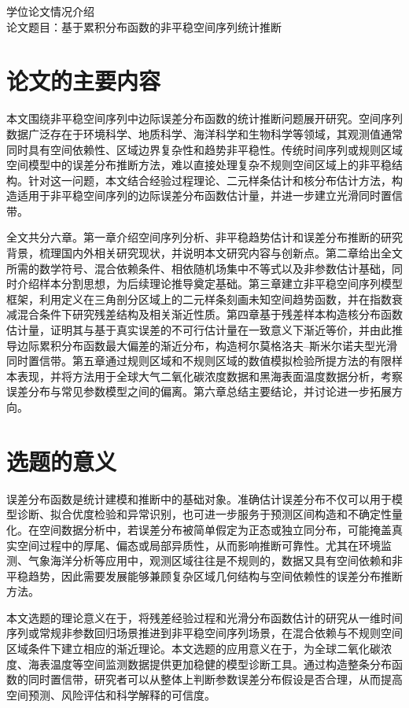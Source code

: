 \documentclass[UTF8,a4paper,11pt]{ctexart}
\begin{document}
\begin{center}
  {\heiti{} 学位论文情况介绍}\\[0.25em]
  { 论文题目：基于累积分布函数的非平稳空间序列统计推断}
\end{center}

\section{论文的主要内容}

本文围绕非平稳空间序列中边际误差分布函数的统计推断问题展开研究。空间序列数据广泛存在于环境科学、地质科学、海洋科学和生物科学等领域，其观测值通常同时具有空间依赖性、区域边界复杂性和趋势非平稳性。传统时间序列或规则区域空间模型中的误差分布推断方法，难以直接处理复杂不规则空间区域上的非平稳结构。针对这一问题，本文结合经验过程理论、二元样条估计和核分布估计方法，构造适用于非平稳空间序列的边际误差分布函数估计量，并进一步建立光滑同时置信带。

全文共分六章。第一章介绍空间序列分析、非平稳趋势估计和误差分布推断的研究背景，梳理国内外相关研究现状，并说明本文研究内容与创新点。第二章给出全文所需的数学符号、混合依赖条件、相依随机场集中不等式以及非参数估计基础，同时介绍样本分割思想，为后续理论推导奠定基础。第三章建立非平稳空间序列模型框架，利用定义在三角剖分区域上的二元样条刻画未知空间趋势函数，并在指数衰减混合条件下研究残差结构及相关渐近性质。第四章基于残差样本构造核分布函数估计量，证明其与基于真实误差的不可行估计量在一致意义下渐近等价，并由此推导边际累积分布函数最大偏差的渐近分布，构造柯尔莫格洛夫--斯米尔诺夫型光滑同时置信带。第五章通过规则区域和不规则区域的数值模拟检验所提方法的有限样本表现，并将方法用于全球大气二氧化碳浓度数据和黑海表面温度数据分析，考察误差分布与常见参数模型之间的偏离。第六章总结主要结论，并讨论进一步拓展方向。

\section{选题的意义}

误差分布函数是统计建模和推断中的基础对象。准确估计误差分布不仅可以用于模型诊断、拟合优度检验和异常识别，也可进一步服务于预测区间构造和不确定性量化。在空间数据分析中，若误差分布被简单假定为正态或独立同分布，可能掩盖真实空间过程中的厚尾、偏态或局部异质性，从而影响推断可靠性。尤其在环境监测、气象海洋分析等应用中，观测区域往往是不规则的，数据又具有空间依赖和非平稳趋势，因此需要发展能够兼顾复杂区域几何结构与空间依赖性的误差分布推断方法。

本文选题的理论意义在于，将残差经验过程和光滑分布函数估计的研究从一维时间序列或常规非参数回归场景推进到非平稳空间序列场景，在混合依赖与不规则空间区域条件下建立相应的渐近理论。本文选题的应用意义在于，为全球二氧化碳浓度、海表温度等空间监测数据提供更加稳健的模型诊断工具。通过构造整条分布函数的同时置信带，研究者可以从整体上判断参数误差分布假设是否合理，从而提高空间预测、风险评估和科学解释的可信度。
\end{document}
